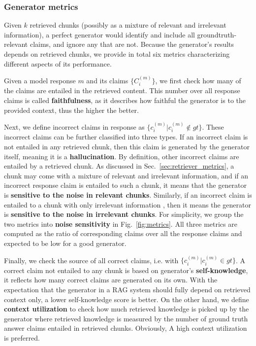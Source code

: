 \subsubsection{Generator metrics}

Given $k$ retrieved chunks (possibly as a mixture of relevant and irrelevant information), a perfect generator would identify and include all groundtruth-relevant claims, and ignore any that are not. Because the generator’s results depends on retrieved chunks, we provide in total six metrics characterizing different aspects of its performance.

Given a model response $m$ and its claims $\{C^{(m)}_i\}$, we first check how many of the claims are entailed in the retrieved content. This number over all response claims is called \textbf{faithfulness}, as it describes how faithful the generator is to the provided context, thus the higher the better.

Next, we define incorrect claims in response as $\{c^{(m)}_i | c^{(m)}_i \notin gt\}$. These incorrect claims can be further classified into three types. If an incorrect claim is not entailed in any retrieved chunk, then this claim is generated by the generator itself, meaning it is a \textbf{hallucination}. By definition, other incorrect claims are entailed by a retrieved chunk. As discussed in Sec.~\ref{sec:retriever_metrics}, a chunk may come with a mixture of relevant and irrelevant information, and if an incorrect response claim is entailed to such a chunk, it means that the generator is \textbf{sensitive to the noise in relevant chunks}. Similarly, if an incorrect claim is entailed to a chunk with only irrelevant information , then it means the generator is \textbf{sensitive to the noise in irrelevant chunks}. For simplicity, we group the two metrics into \textbf{noise sensitivity} in Fig.~\ref{fig:metrics}. All three metrics are computed as the ratio of corresponding claims over all the response claims and expected to be low for a good generator.

Finally, we check the source of all correct claims, i.e. with $\{c^{(m)}_i | c^{(m)}_i \in gt\}$. A correct claim not entailed to any chunk is based on generator’s \textbf{self-knowledge}, it reflects how many correct claims are generated on its own. With the expectation that the generator in a RAG system should fully depend on retrieved context only, a lower self-knowledge score is better. On the other hand, we define \textbf{context utilization} to check how much retrieved knowledge is picked up by the generator where retrieved knowledge is measured by the number of ground truth answer claims entailed in retrieved chunks. Obviously, A high context utilization is preferred.


